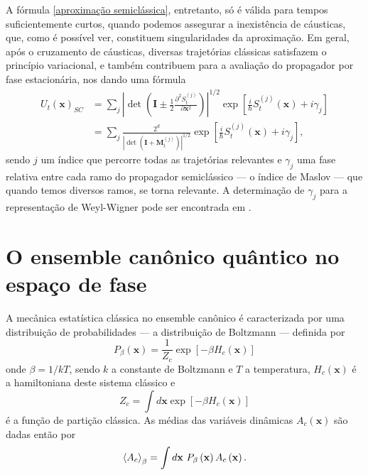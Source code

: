 \documentclass[
	12pt,
	oneside,			%
	a4paper,			%
	english,			%
	brazil				%
	]{abntex2}
\theoremstyle{definition}
\begin{document}
A fórmula \eqref{aproximação semiclássica}, entretanto, só é válida para tempos suficientemente curtos, quando podemos assegurar a inexistência de cáusticas, que, como é possível ver, constituem singularidades da aproximação. Em geral, após o cruzamento de cáusticas, diversas trajetórias clássicas satisfazem o princípio variacional, e também contribuem para a avaliação do propagador por fase estacionária, nos dando uma fórmula
\begin{equation}
    \label{aproximação semiclássica v2}
    \begin{aligned}
        U_t\left( \mathbf{x} \right)_{SC} &= \sum_j \left|\det \left( \mathbf{I} \pm \frac{1}{2} \frac{\partial^2 S^{(j)}_t}{\partial \mathbf{x}^2}\right) \right|^{1/2} \exp \left[ \frac{i}{\hbar} S^{(j)}_t \left(\mathbf{x} \right) +i \gamma_j \right] \\
         &= \sum_j   \frac{2^d}{\left|\det \left( \mathbf{I} + \mathbf{M}_t^{(j)}\right) \right|^{1/2}}\exp \left[ \frac{i}{\hbar} S^{(j)}_t \left(\mathbf{x} \right) +i \gamma_j\right],
    \end{aligned}
\end{equation}
sendo $j$ um índice que percorre todas as trajetórias relevantes e $\gamma_j$ uma fase relativa entre cada ramo do propagador semiclássico — o índice de Maslov — que quando temos diversos ramos, se torna relevante. A determinação de $\gamma_j$ para a representação de Weyl-Wigner pode ser encontrada em \cite{de2014metaplectic}.

\chapter{O ensemble canônico quântico no espaço de fase}
\label{O ensemble canônico quântico no espaço de fase}

A mecânica estatística clássica no ensemble canônico é caracterizada por uma distribuição de probabilidades — a distribuição de Boltzmann — definida por
\begin{equation}
    P_\beta \left( \mathbf{x} \right) = \frac{1}{Z_c} \exp \left[ - \beta H_c \left( \mathbf{x} \right) \right]
\end{equation}
onde $\beta = 1/kT$, sendo $k$ a constante de Boltzmann e $T$ a temperatura, $H_c\left( \mathbf{x} \right)$ é a hamiltoniana deste sistema clássico e 
\begin{equation}
    Z_c = \int d \mathbf{x} \exp \left[ - \beta H_c \left( \mathbf{x} \right) \right]
\end{equation}
é a função de partição clássica. As médias das variáveis dinâmicas $A_c(\mathbf{x})$ são dadas então por
\begin{equation}
    \ev{A_c}_\beta = \int d \mathbf{x} \ P_\beta \left( \mathbf{x} \right) A_c\left( \mathbf{x} \right)  .
\end{equation}
\end{document}
